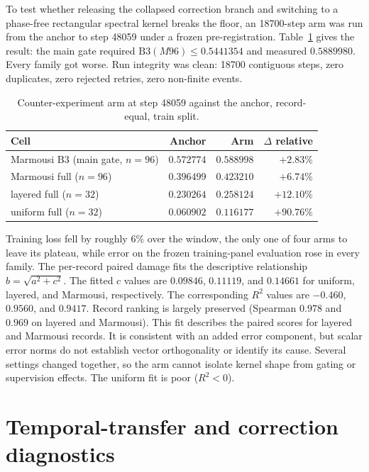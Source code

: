 \documentclass[11pt,a4paper]{article}
\begin{document}
To test whether releasing the collapsed correction branch and switching to a phase-free
rectangular spectral kernel breaks the floor, an 18700-step arm was run from the anchor to
step 48059 under a frozen pre-registration. Table~\ref{tab:armr4} gives the result: the main
gate required $\mathrm{B3}(M96) \le 0.5441354$ and measured $0.5889980$. Every family got
worse. Run integrity was clean: 18700 contiguous steps, zero duplicates, zero rejected
retries, zero non-finite events.

\begin{table}[t]
\centering
\caption{Counter-experiment arm at step 48059 against the anchor, record-equal, train split.}
\label{tab:armr4}
\begin{tabular}{lrrr}
\toprule
Cell & Anchor & Arm & $\Delta$ relative \\
\midrule
Marmousi B3 (main gate, $n=96$) & $0.572774$ & $0.588998$ & $+2.83\%$ \\
Marmousi full ($n=96$)          & $0.396499$ & $0.423210$ & $+6.74\%$ \\
layered full ($n=32$)           & $0.230264$ & $0.258124$ & $+12.10\%$ \\
uniform full ($n=32$)           & $0.060902$ & $0.116177$ & $+90.76\%$ \\
\bottomrule
\end{tabular}
\end{table}

Training loss fell by roughly $6\%$ over the window, the only one of four arms to leave its
plateau, while error on the frozen training-panel evaluation rose in every family. The per-record paired damage
fits the descriptive relationship $b=\sqrt{a^2+c^2}$. The fitted $c$ values are
$0.09846$, $0.11119$, and $0.14661$ for uniform, layered, and Marmousi, respectively.
The corresponding $R^2$ values are $-0.460$, $0.9560$, and $0.9417$.
Record ranking is largely preserved (Spearman $0.978$ and $0.969$ on layered and Marmousi). This fit describes the paired scores for layered and Marmousi records. It is consistent
with an added error component, but scalar error norms do not establish vector orthogonality
or identify its cause. Several settings changed together, so the arm cannot isolate kernel
shape from gating or supervision effects. The uniform fit is poor ($R^2<0$).

\section{Temporal-transfer and correction diagnostics}
\end{document}
